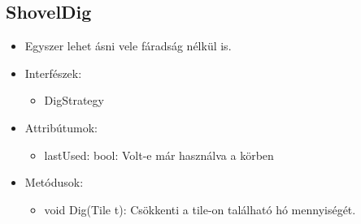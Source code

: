 \subsection{ShovelDig}
\begin{itemize}
	\item Egyszer lehet ásni vele fáradság nélkül is.
\item Interfészek:
\begin{itemize}
	\item DigStrategy
\end{itemize}

\item Attribútumok:
\begin{itemize}
	\item lastUsed: bool: Volt-e már használva a körben
\end{itemize}
\item Metódusok:
\begin{itemize}
	\item void Dig(Tile t): Csökkenti a tile-on található hó mennyiségét.
\end{itemize}
\end{itemize}

